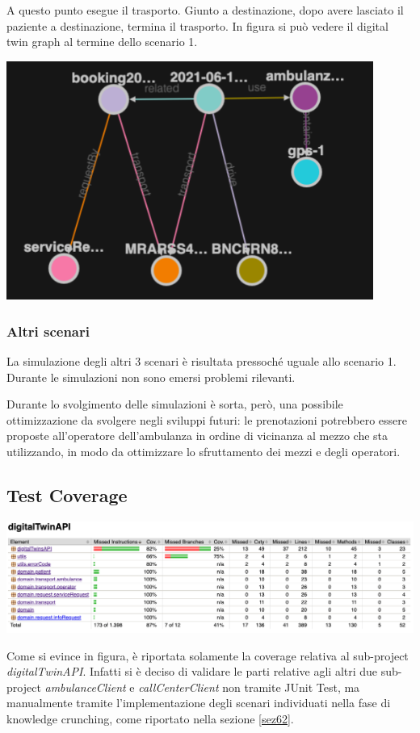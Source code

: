 \documentclass[12pt]{article}
\begin{document}
 A questo punto esegue il trasporto. 
 Giunto a destinazione, dopo avere lasciato il paziente a destinazione, termina il trasporto.
 In figura si può vedere il digital twin graph al termine dello scenario 1.
 \hfill \break
 
 \centerline{
 \includegraphics[width=12cm]{fig/scenario1-fine.png}}
\hfill \break

\subsubsection{Altri scenari}
La simulazione degli altri 3 scenari è risultata pressoché uguale allo scenario 1. Durante le simulazioni non sono emersi problemi rilevanti.

Durante lo svolgimento delle simulazioni è sorta, però, una possibile ottimizzazione da svolgere negli sviluppi futuri: le prenotazioni potrebbero essere proposte all'operatore dell'ambulanza in ordine di vicinanza al mezzo che sta utilizzando, in modo da ottimizzare lo sfruttamento dei mezzi e degli operatori. 

\subsection{Test Coverage}
 \centerline{
 \includegraphics[width=18cm]{fig/testCoverage.png}}
\hfill \break

Come si evince in figura, è riportata solamente la coverage relativa al sub-project \textit{digitalTwinAPI}. Infatti si è deciso di validare le parti relative agli altri due sub-project \textit{ambulanceClient} e \textit{callCenterClient} non tramite JUnit Test, ma manualmente tramite l'implementazione degli scenari individuati nella fase di knowledge crunching, come riportato nella sezione \ref{sez62}.  
\end{document}

